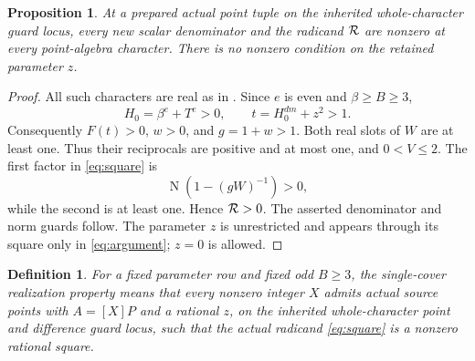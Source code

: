 \documentclass[11pt,a4paper]{article}
\newtheorem{proposition}[theorem]{Proposition}
\newtheorem{definition}[theorem]{Definition}
\DeclareMathOperator{\Nm}{N}
\begin{document}
\begin{proposition}\label{prop:guards}
At a prepared actual point tuple on the inherited whole-character
guard locus, every new scalar denominator and the radicand
\({\cal R}\) are nonzero at every point-algebra character.
There is no nonzero condition on the retained parameter \(z\).
\end{proposition}
\begin{proof}
All such characters are real as in \cite{Reweighted,Native}.
Since \(e\) is even and \(\beta\ge B\ge3\),
\[
 H_0=\beta^e+T^e>0,\qquad
 t=H_0^{dm}+z^2>1.
\]
Consequently \(F(t)>0\), \(w>0\), and \(g=1+w>1\).
Both real slots of \(W\) are at least one. Thus their reciprocals
are positive and at most one, and \(0<V\le2\).
The first factor in \eqref{eq:square} is
\[
 \Nm(1-(gW)^{-1})>0,
\]
while the second is at least one. Hence \({\cal R}>0\).
The asserted denominator and norm guards follow.
The parameter \(z\) is unrestricted and appears through its square
only in \eqref{eq:argument}; \(z=0\) is allowed.
\end{proof}

\begin{definition}\label{def:realization}
For a fixed parameter row and fixed odd \(B\ge3\), the single-cover
realization property means that every nonzero integer \(X\) admits
actual source points with \(A=[X]P\) and a rational \(z\), on the
inherited whole-character point and difference guard locus, such
that the actual radicand \eqref{eq:square} is a nonzero rational square.
\end{definition}
\end{document}
